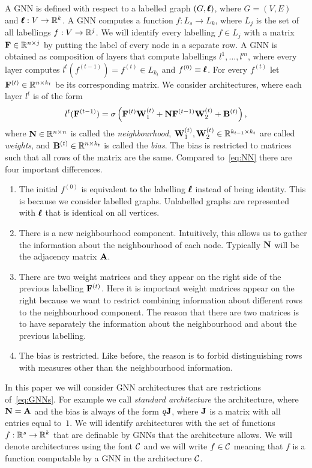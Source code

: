 A GNN is defined with respect to a labelled graph $(G,\pmb{\ell})$, where $G = (V,E)$ and $\pmb{\ell} : V \to \mathbb{R}^{k}$. A GNN computes a function $f : L_s \to L_k$, where $L_j$ is the set of all labellings $f : V \to \mathbb{R}^j$.
We will identify every labelling $f \in L_j$ with a matrix $\mathbf{F} \in \mathbb{R}^{n \times j}$ by putting the label of every node in a separate row.
A GNN is obtained as composition of layers that compute labellings $l^1, \ldots, l^m$, where every layer computes $l^t(f^{(t-1)}) = f^{(t)} \in L_{k_t}$ and $f^{(0)} \equiv \pmb{\ell}$. For every $f^{(t)}$ let $\mathbf{F}^{(t)} \in \mathbb{R}^{n \times k_{t}}$ be its corresponding matrix. We consider architectures, where each layer $l^t$ is of the form
\begin{equation}\label{eq:GNNs}
l^t(\mathbf{F}^{(t-1)}) = \sigma \left( \mathbf{F}^{(t)}\mathbf{W}_1^{(t)} + \mathbf{N}\mathbf{F}^{(t-1)}\mathbf{W}_2^{(t)} + \mathbf{B}^{(t)} \right),
\end{equation}
where $\mathbf{N} \in \mathbb{R}^{n \times n}$ is called the \emph{neighbourhood}, $\mathbf{W}_1^{(t)}, \mathbf{W}_2^{(t)} \in \mathbb{R}^{k_{t-1} \times k_t}$ are called \emph{weights}, and $\mathbf{B}^{(t)} \in \mathbb{R}^{n \times k_t}$ is called the \emph{bias}. The bias is restricted to matrices such that all rows of the matrix are the same. Compared to~\eqref{eq:NN} there are four important differences.
\begin{enumerate}
\item The initial $f^{(0)}$ is equivalent to the labelling $\pmb{\ell}$ instead of being identity. This is because we consider labelled graphs. Unlabelled graphs are represented with $\pmb{\ell}$ that is identical on all vertices.
 \item There is a new neighbourhood component. Intuitively, this allows us to gather the information about the neighbourhood of each node. Typically $\mathbf{N}$ will be the adjacency matrix $\mathbf{A}$.
 \item There are two weight matrices and they appear on the right side of the previous labelling $\mathbf{F}^{(t)}$. Here it is important weight matrices appear on the right because we want to restrict combining information about different rows to the neighbourhood component. The reason that there are two matrices is to have separately the information about the neighbourhood and about the previous labelling.
 \item The bias is restricted. Like before, the reason is to forbid distinguishing rows with measures other than the neighbourhood information.
\end{enumerate}
In this paper we will consider GNN architectures that are restrictions of~\eqref{eq:GNNs}. For example we call \emph{standard architecture} the architecture, where $\mathbf{N} = \mathbf{A}$ and the bias is always of the form $q \mathbf{J}$, where $\mathbf{J}$ is a matrix with all entries equal to~$1$. We will identify architectures with the set of functions $f : \mathbb{R}^s \to \mathbb{R}^k$ that are definable by GNNs that the architecture allows. We will denote architectures using the font $\mathcal{C}$ and we will write $f \in \mathcal{C}$ meaning that $f$ is a function computable by a GNN in the architecture $\mathcal{C}$.

